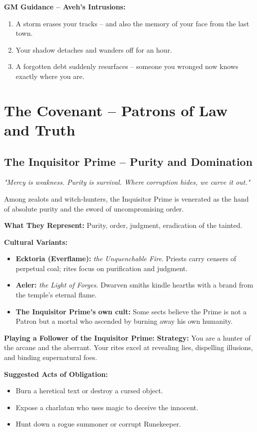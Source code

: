 \documentclass[10pt,a5paper]{book}
\begin{document}
\textbf{GM Guidance -- Aveh's Intrusions:}
\begin{enumerate}
    \item A storm erases your tracks -- and also the memory of your face from the last town.
    \item Your shadow detaches and wanders off for an hour.
    \item A forgotten debt suddenly resurfaces -- someone you wronged now knows exactly where you are.
\end{enumerate}

\clearpage

\section{The Covenant -- Patrons of Law and Truth}

\subsection{The Inquisitor Prime -- Purity and Domination}
\label{patron:inquisitor}

\textit{"Mercy is weakness. Purity is survival. Where corruption hides, we carve it out."}

Among zealots and witch‑hunters, the Inquisitor Prime is venerated as the hand of absolute purity and the sword of uncompromising order.

\textbf{What They Represent:} Purity, order, judgment, eradication of the tainted.

\textbf{Cultural Variants:}
\begin{itemize}
    \item \textbf{Ecktoria (Everflame):} \textit{the Unquenchable Fire}. Priests carry censers of perpetual coal; rites focus on purification and judgment.
    \item \textbf{Aeler:} \textit{the Light of Forges}. Dwarven smiths kindle hearths with a brand from the temple's eternal flame.
    \item \textbf{The Inquisitor Prime's own cult:} Some sects believe the Prime is not a Patron but a mortal who ascended by burning away his own humanity.
\end{itemize}

\textbf{Playing a Follower of the Inquisitor Prime:}
\textbf{Strategy:} You are a hunter of the arcane and the aberrant. Your rites excel at revealing lies, dispelling illusions, and binding supernatural foes.

\textbf{Suggested Acts of Obligation:}
\begin{itemize}
    \item Burn a heretical text or destroy a cursed object.
    \item Expose a charlatan who uses magic to deceive the innocent.
    \item Hunt down a rogue summoner or corrupt Runekeeper.
\end{itemize}
\end{document}
